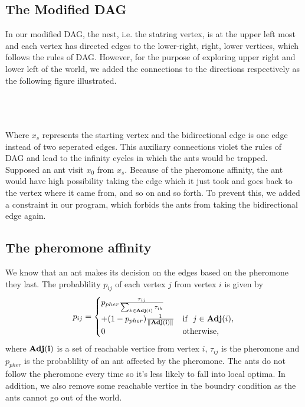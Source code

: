 \documentclass[12pt,journal,compsoc]{IEEEtran}
\begin{document}
\subsection{The Modified DAG}
In our modified DAG, the nest, i.e. the statring vertex, is at the upper left most and each vertex has directed edges to the lower-right, right, lower vertices, which follows the rules of DAG. However, for the purpose of exploring upper right and lower left of the world, we added the connections to the directions respectively as the following figure illustrated.\\\\
\\\\
Where $x_s$ represents the starting vertex and the bidirectional edge is one edge instead of two seperated edges. This auxiliary connections violet the rules of DAG and lead to the infinity cycles in which the ants would be trapped. Supposed an ant visit $x_0$ from $x_s$. Because of the pheromone affinity, the ant would have high possibility taking the edge which it just took and goes back to the vertex where it came from, and so on and so forth. To prevent this, we added a constraint in our program, which forbids the ants from taking the bidirectional edge again.

\subsection{The pheromone affinity}
We know that an ant makes its decision on the edges based on the pheromone they last. The probablility $p_{ij}$ of each vertex $j$ from vertex $i$ is given by
\[p_{ij}=\begin{cases} p_{pher}{\tau_{ij}\over \sum\nolimits_{k\in {\bf Adj}(i)}\tau_{ik}}\\ + (1-p_{pher}){1\over\|\bf Adj(i)\|} &\mbox{if }\ j\in {\bf Adj}(i), \\
0 & \mbox{otherwise,}\end{cases}\]
where $\bf Adj(i)$ is a set of reachable vertice from vertex $i$, $\tau_{ij}$ is the pheromone and $p_{pher}$ is the probablility of an ant affected by the pheromone. The ants do not follow the pheromone every time so it's less likely to fall into local optima. In addition, we also remove some reachable vertice in the boundry condition as the ants cannot go out of the world.
\end{document}
